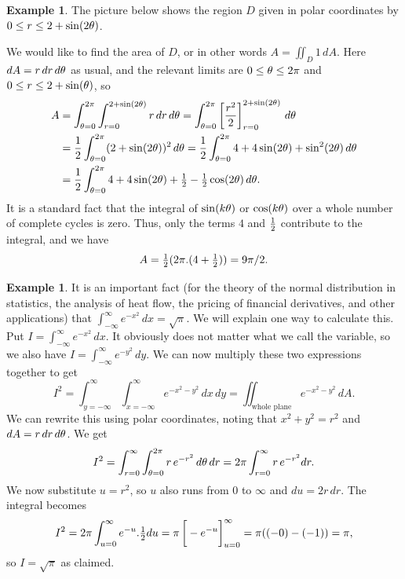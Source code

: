 \documentclass[reqno]{amsart}
\theoremstyle{definition}
\newtheorem{example}[theorem]{Example}
\begin{document}
\begin{example}
 The picture below shows the region $D$ given in polar coordinates by
 $0\leq r\leq 2+\sin(2\theta)$.  
 \begin{center}
 \end{center}
 We would like to find the area of $D$, or in other words
 $A=\iint_D1\,dA$.  Here $dA=r\,dr\,d\theta$ as usual, and the relevant
 limits are $0\leq\theta\leq 2\pi$ and $0\leq r\leq 2+\sin(\theta)$, so
 \begin{align*}
  A &= \int_{\azi=0}^{2\pi} \int_{r=0}^{2+\sin(2\azi)} r\,dr\,d\azi 
     = \int_{\azi=0}^{2\pi}
        \CH{\frac{r^2}{2}}_{r=0}^{2+\sin(2\azi)} \,d\azi \\
    &= \frac{1}{2} \int_{\azi=0}^{2\pi} (2+\sin(2\azi))^2 \,d\azi
     = \frac{1}{2} \int_{\azi=0}^{2\pi} 4+4\sin(2\azi)+\sin^2(2\azi) \,d\azi \\
    &= \frac{1}{2} \int_{\azi=0}^{2\pi} 4+4\sin(2\azi)+\half-\half\cos(2\azi) \,d\azi.
 \end{align*}
 It is a standard fact that the integral of $\sin(k\theta)$ or
 $\cos(k\theta)$ over a whole number of complete cycles is zero.  Thus,
 only the terms $4$ and $\tfrac{1}{2}$ contribute to the integral, and we
 have
 \[ A = \tfrac{1}{2}(2\pi.(4+\tfrac{1}{2})) = 9\pi/2. \]
\end{example}

\begin{example}
 It is an important fact (for the theory of the normal distribution in
 statistics, the analysis of heat flow, the pricing of financial
 derivatives, and other applications) that
 $\int_{-\infty}^\infty e^{-x^2}\,dx=\sqrt{\pi}$.  We will explain one
 way to calculate this.  Put $I=\int_{-\infty}^\infty e^{-x^2}\,dx$.
 It obviously does not matter what we call the variable, so we also
 have $I=\int_{-\infty}^\infty e^{-y^2}\,dy$.  We can now multiply
 these two expressions together to get 
 \[ I^2 = \int_{y=-\infty}^\infty \int_{x=-\infty}^\infty 
     e^{-x^2-y^2}\,dx\,dy = 
      \iint_{\text{whole plane}} e^{-x^2-y^2}\,dA.
 \]
 We can rewrite this using polar coordinates, noting that
 $x^2+y^2=r^2$ and $dA=r\,dr\,d\theta$.  We get
 \[ I^2 = \int_{r=0}^\infty \int_{\theta=0}^{2\pi}r\,e^{-r^2}\,d\theta\,dr
      = 2\pi \int_{r=0}^\infty r\,e^{-r^2} dr.
 \]
 We now substitute $u=r^2$, so $u$ also runs from $0$ to $\infty$ and
 $du=2r\,dr$.  The integral becomes 
 \[ I^2 = 2\pi \int_{u=0}^\infty e^{-u}.\half du =
     \pi \CH{-e^{-u}}_{u=0}^\infty =
      \pi ((-0)-(-1)) = \pi,
 \]
 so $I=\sqrt{\pi}$ as claimed.
\end{example}
\end{document}
